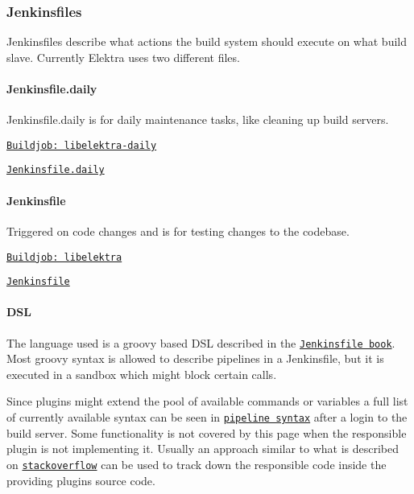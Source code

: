 \subsubsection*{Jenkinsfiles}

Jenkinsfiles describe what actions the build system should execute on what build slave. Currently Elektra uses two different files.

\paragraph*{Jenkinsfile.\+daily}


\begin{DoxyItemize}
\item Jenkinsfile.\+daily is for daily maintenance tasks, like cleaning up build servers.
\item \href{https://build.libelektra.org/jenkins/job/libelektra-daily/}{\tt Buildjob\+: libelektra-\/daily}
\item \href{https://master.libelektra.org/scripts/jenkins/Jenkinsfile.daily}{\tt Jenkinsfile.\+daily}
\end{DoxyItemize}

\paragraph*{Jenkinsfile}


\begin{DoxyItemize}
\item Triggered on code changes and is for testing changes to the codebase.
\item \href{https://build.libelektra.org/jenkins/job/libelektra/}{\tt Buildjob\+: libelektra}
\item \href{https://master.libelektra.org/scripts/jenkins/Jenkinsfile}{\tt Jenkinsfile}
\end{DoxyItemize}

\paragraph*{D\+SL}

The language used is a groovy based D\+SL described in the \href{https://jenkins.io/doc/book/pipeline/jenkinsfile/}{\tt Jenkinsfile book}. Most groovy syntax is allowed to describe pipelines in a Jenkinsfile, but it is executed in a sandbox which might block certain calls.

Since plugins might extend the pool of available commands or variables a full list of currently available syntax can be seen in \href{https://build.libelektra.org/jenkins/job/libelektra/pipeline-syntax/}{\tt pipeline syntax} after a login to the build server. Some functionality is not covered by this page when the responsible plugin is not implementing it. Usually an approach similar to what is described on \href{https://stackoverflow.com/questions/51103359/jenkins-pipeline-return-value-of-build-step}{\tt stackoverflow} can be used to track down the responsible code inside the providing plugins source code.

